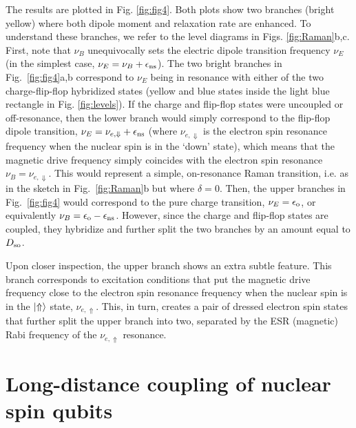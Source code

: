 The results are plotted in Fig. \ref{fig:fig4}. Both plots show two branches (bright yellow) where both dipole moment and relaxation rate are enhanced. To understand these branches, we refer to the level diagrams in Figs. \ref{fig:Raman}b,c. First, note that $\nu_B$ unequivocally sets the electric dipole transition frequency $\nu_E$ (in the simplest case, $\nu_E=\nu_B+\epsilon_{\rm ns}$). The two bright branches in  Fig.~\ref{fig:fig4}a,b correspond to $\nu_E$ being in resonance with either of the two charge-flip-flop hybridized states (yellow and blue states inside the light blue rectangle in Fig. \ref{fig:levels}). If the charge and flip-flop states were uncoupled or off-resonance, then the lower branch would simply correspond to the flip-flop dipole transition, $\nu_E=\nu_{e,\Downarrow}+\epsilon_{\rm ns}$ (where $\nu_{e,\Downarrow}$ is the electron spin resonance frequency when the nuclear spin is in the `down' state), which means that the magnetic drive frequency simply coincides with the electron spin resonance $\nu_B=\nu_{e,\Downarrow}$. This would represent a simple, on-resonance Raman transition, i.e. as in the sketch in Fig.~\ref{fig:Raman}b but where $\delta=0$. Then, the upper branches in Fig.~\ref{fig:fig4} would correspond to the pure charge transition, $\nu_E=\epsilon_{\rm o}$, or equivalently $\nu_B=\epsilon_{\rm o}-\epsilon_{\rm ns}$. However, since the charge and flip-flop states are coupled, they hybridize and further split the two branches by an amount equal to $D_{\rm so}$.

Upon closer inspection, the upper branch shows an extra subtle feature. This branch corresponds to excitation conditions that put the magnetic drive frequency close to the electron spin resonance frequency when the nuclear spin is in the $\ket{\Uparrow}$ state, $\nu_{e,\Uparrow}$. This, in turn, creates a pair of dressed electron spin states that further split the upper branch into two, separated by the ESR (magnetic) Rabi frequency of the $\nu_{e,\Uparrow}$ resonance. 

\section{Long-distance coupling of nuclear spin qubits} \label{sec:long}


